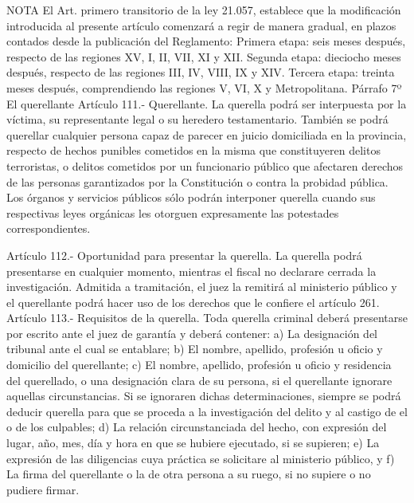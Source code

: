 NOTA
      El Art. primero transitorio de la ley 21.057, establece que la modificación introducida al presente artículo comenzará a regir de manera gradual, en plazos contados desde la publicación del Reglamento: Primera etapa: seis meses después, respecto de las regiones XV, I, II, VII, XI y XII. Segunda etapa: dieciocho meses después, respecto de las regiones III, IV, VIII, IX y XIV.  Tercera etapa:  treinta meses después, comprendiendo las regiones V, VI, X y Metropolitana.
    Párrafo 7º El querellante
    Artículo 111.- Querellante. La querella podrá ser interpuesta por la víctima, su representante legal o su heredero testamentario.
    También se podrá querellar cualquier persona capaz de parecer en juicio domiciliada en la provincia, respecto de hechos punibles cometidos en la misma que constituyeren delitos terroristas, o delitos cometidos por un funcionario público que afectaren derechos de las personas garantizados por la Constitución o contra la probidad pública.
    Los órganos y servicios públicos sólo podrán interponer querella cuando sus respectivas leyes orgánicas les otorguen expresamente las potestades correspondientes.


    Artículo 112.- Oportunidad para presentar la querella. La querella podrá presentarse en cualquier momento, mientras el fiscal no declarare cerrada la investigación.
    Admitida a tramitación, el juez la remitirá al ministerio público y el querellante podrá hacer uso de los derechos que le confiere el artículo 261.
    Artículo 113.- Requisitos de la querella. Toda querella criminal deberá presentarse por escrito ante el juez de garantía y deberá contener:
    a) La designación del tribunal ante el cual se entablare;
    b) El nombre, apellido, profesión u oficio y domicilio del querellante;
    c) El nombre, apellido, profesión u oficio y residencia del querellado, o una designación clara de su persona, si el querellante ignorare aquellas circunstancias. Si se ignoraren dichas determinaciones, siempre se podrá deducir querella para que se proceda a la investigación del delito y al castigo de el o de los culpables;
    d) La relación circunstanciada del hecho, con expresión del lugar, año, mes, día y hora en que se hubiere ejecutado, si se supieren;
    e) La expresión de las diligencias cuya práctica se solicitare al ministerio público, y
    f) La firma del querellante o la de otra persona a su ruego, si no supiere o no pudiere firmar.

